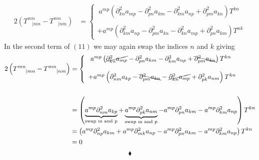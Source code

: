\begin{align}
2\left(T^{mn}_{\ \ \ \ |mn}-T^{mn}_{\ \ \ \ |nm}\right) 
&= \left\{\begin{array}{l} \ a^{mp} \left( \partial^2_{kn} a_{mp} - \partial^2_{pn} a_{km} - \partial^2_{km} a_{np} + \partial^2_{pm} a_{kn}  \right) T^{kn}  \\\\  + a^{mp} \left( \partial^2_{km} a_{np}  - \partial^2_{pm} a_{kn}- \partial^2_{kn} a_{mp} + \partial^2_{pn} a_{km}\right)T^{nk} \end{array}\right.
\end{align}
In the second term of $(11)$ we may again swap the indices $n$ and $k$ giving
\begin{align}
2\left(T^{mn}_{\ \ \ \ |mn}-T^{mn}_{\ \ \ \ |nm}\right) 
&= \left\{\begin{array}{l} \ a^{mp} \left( \cancel{\partial^2_{kn} a_{mp}} - \partial^2_{pn} a_{km} - \partial^2_{km} a_{np} + \bcancel{\partial^2_{pm} a_{kn} } \right) T^{kn}  \\\\  + a^{mp} \left( \partial^2_{nm} a_{kp}  - \bcancel{\partial^2_{pm} a_{kn}}- \cancel{\partial^2_{kn} a_{mp}} + \partial^2_{pk} a_{nm}\right)T^{kn} \end{array}\right.\\\\
&=  \left( \underbrace{a^{mp}\partial^2_{nm} a_{kp}}_{\text{swap m and p}}  + \underbrace{a^{mp}\partial^2_{pk} a_{nm}}_{\text{swap m and p}} - a^{mp}\partial^2_{pn} a_{km} -a^{mp} \partial^2_{km} a_{np} \right) T^{kn}\\
&=  \left( a^{mp}\partial^2_{np} a_{km}  + a^{mp}\partial^2_{mk} a_{np} - a^{mp}\partial^2_{pn} a_{km} -a^{mp} \partial^2_{km} a_{np} \right) T^{kn}\\
&=0
\end{align}
$$\blacklozenge$$
\newpage

